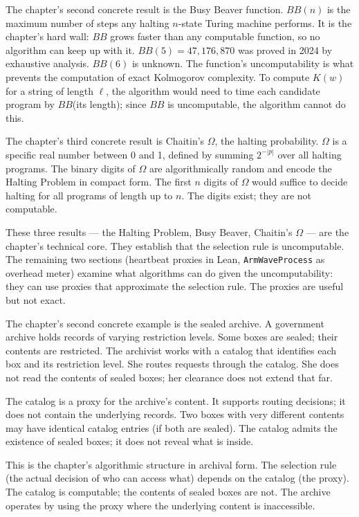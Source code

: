 \begin{chapteressay}
The chapter's second concrete result is the Busy Beaver function.
$BB(n)$ is the maximum number of steps any halting $n$-state
Turing machine performs. It is the chapter's hard wall: $BB$ grows
faster than any computable function, so no algorithm can keep up
with it. $BB(5) = 47{,}176{,}870$ was proved in 2024 by exhaustive
analysis. $BB(6)$ is unknown. The function's uncomputability is
what prevents the computation of exact Kolmogorov complexity. To
compute $K(w)$ for a string of length $\ell$, the algorithm would
need to time each candidate program by $BB$(its length); since $BB$
is uncomputable, the algorithm cannot do this.

The chapter's third concrete result is Chaitin's $\Omega$, the
halting probability. $\Omega$ is a specific real number between 0
and 1, defined by summing $2^{-|p|}$ over all halting programs.
The binary digits of $\Omega$ are algorithmically random and
encode the Halting Problem in compact form. The first $n$ digits
of $\Omega$ would suffice to decide halting for all programs of
length up to $n$. The digits exist; they are not computable.

These three results --- the Halting Problem, Busy Beaver,
Chaitin's $\Omega$ --- are the chapter's technical core. They
establish that the selection rule is uncomputable. The remaining
two sections (heartbeat proxies in Lean,
\texttt{ArmWaveProcess} as overhead meter) examine what
algorithms can do given the uncomputability: they can use
proxies that approximate the selection rule. The proxies are
useful but not exact.

The chapter's second concrete example is the sealed archive. A
government archive holds records of varying restriction levels.
Some boxes are sealed; their contents are restricted. The
archivist works with a catalog that identifies each box and its
restriction level. She routes requests through the catalog. She
does not read the contents of sealed boxes; her clearance does
not extend that far.

The catalog is a proxy for the archive's content. It supports
routing decisions; it does not contain the underlying records.
Two boxes with very different contents may have identical
catalog entries (if both are sealed). The catalog admits the
existence of sealed boxes; it does not reveal what is inside.

This is the chapter's algorithmic structure in archival form.
The selection rule (the actual decision of who can access what)
depends on the catalog (the proxy). The catalog is computable;
the contents of sealed boxes are not. The archive operates by
using the proxy where the underlying content is inaccessible.


\end{chapteressay}
